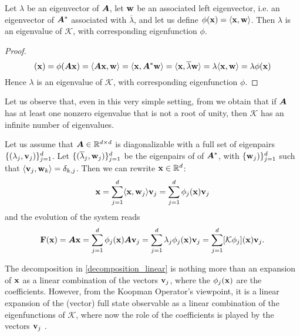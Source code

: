 \begin{prop}
Let $\lambda$ be an eigenvector of $\vb*{A}$, let $\vb{w}$ be an associated left eigenvector, i.e. an eigenvector of $\vb*{A}^*$ associated with $\overline{\lambda}$, and let us define $\phi(\vb{x}) = \langle \vb{x},\vb{w} \rangle$. Then $\lambda$ is an eigenvalue of $\mathcal{K}$, with corresponding eigenfunction $\phi$.
\end{prop}
\begin{proof}
\begin{equation*}
    [\mathcal{K}\phi](\vb{x}) = \phi(\vb*{A}\vb{x}) = \langle \vb*{A}\vb{x},\vb{w} \rangle = \langle \vb{x}, \vb*{A}^*\vb{w} \rangle = \langle \vb{x}, \overline{\lambda}\vb{w} \rangle = \lambda \langle \vb{x},\vb{w} \rangle = \lambda \phi(\vb{x})
\end{equation*}
Hence $\lambda$ is an eigenvalue of $\mathcal{K}$, with corresponding eigenfunction $\phi$.
\end{proof}

Let us observe that, even in this very simple setting, from  we obtain that if $\vb*{A}$ has at least one nonzero eigenvalue that is not a root of unity, then $\mathcal{K}$ has an infinite number of eigenvalues.

\begin{corollary}
Let us assume that $\vb*{A}\in\mathbb{R}^{d\times d}$ is diagonalizable with a full set of eigenpairs $\{(\lambda_j, \vb{v}_j)\}_{j=1}^{d}$. Let $\{(\overline{\lambda}_j, \vb{w}_j)\}_{j=1}^{d}$ be the eigenpairs of of $\vb*{A}^*$, with $\{\vb{w}_j)\}_{j=1}^{d}$ such that $\langle \vb{v}_j, \vb{w}_k\rangle = \delta_{k,j}$. Then we can rewrite $\vb{x}\in\mathbb{R}^d$:
\begin{equation}
    \label{decomposition_linear}
    \vb{x} = \sum_{j=1}^d \langle \vb{x}, \vb{w}_j\rangle \vb{v}_j = \sum_{j=1}^d \phi_j(\vb{x}) \vb{v}_j
\end{equation}
and the evolution of the system reads
\begin{equation}
    \label{evolution_linear}
    \vb{F}(\vb{x}) = \vb*{A}\vb{x}  = \sum_{j=1}^d \phi_j(\vb{x}) \vb*{A}\vb{v}_j = \sum_{j=1}^d \lambda_j \phi_j(\vb{x}) \vb{v}_j = \sum_{j=1}^d [\mathcal{K}\phi_j](\vb{x})\vb{v}_j.
\end{equation}
\end{corollary}

The decomposition in \eqref{decomposition_linear} is nothing more than an expansion of $\vb{x}$ as a linear combination of the vectors $\vb{v}_j$, where the $\phi_j(\vb{x})$ are the coefficients. However, from the Koopman Operator's viewpoint, it is a linear expansion of the (vector) full state observable as a linear combination of the eigenfunctions of $\mathcal{K}$, where now the role of the coefficients is played by the vectors $\vb{v}_j$ \cite{rowley_spectral_2009}. 

